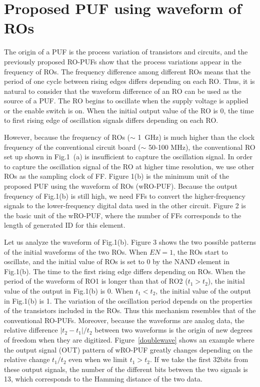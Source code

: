 ﻿\documentclass[aps,preprint,prb,superscriptaddress,amsmath,showpacs,tightenlines]{revtex4}
\begin{document}
\section{Proposed PUF using waveform of ROs}
The origin of a PUF is the process variation of transistors and circuits, 
and the previously proposed RO-PUFs show that
the process variations appear in the frequency of ROs.
The frequency difference among different ROs 
means that the period of one cycle between rising edges 
differs depending on each RO. 
Thus, it is natural to consider that the waveform difference of an RO
can be used as the source of a PUF.
The RO begins to oscillate when the supply voltage is applied
or the enable switch is on.
When the initial output value of the RO is 0, 
the time to first rising edge of oscillation signals differs
depending on each RO.

However, because the frequency of ROs ($\sim$ 1~GHz) 
is much higher than the clock frequency of the conventional circuit board ($\sim$ 50-100 MHz),
the conventional RO set up shown in Fig.1~(a) is insufficient to 
capture the oscillation signal.
In order to capture the oscillation signal of the RO at higher time resolution, 
we use other ROs as the sampling clock of FF.
Figure 1(b) is the minimum unit of the proposed PUF using the waveform of ROs (wRO-PUF).
Because the output frequency of Fig.1(b) is still high,
we need FFs to convert the higher-frequency signals to the lower-frequency digital data
 used in the other circuit.
Figure 2 is the basic unit of the wRO-PUF, 
where the number of FFs corresponds to the length of 
generated ID for this element.


Let us analyze the waveform of Fig.1(b).
Figure 3 shows the two possible patterns of the initial waveforms of the 
two ROs.
When $EN=1$, the ROs start to oscillate, and 
the initial value of ROs is set to 0 by the NAND element in Fig.1(b).
The time to the first rising edge differs depending on ROs.
When the period of the waveform of RO1 is longer than that of RO2 ($t_1>t_2$),
the initial value of the output in Fig.1(b) is 0.
When $t_1<t_2$, the initial value of the output in Fig.1(b) is 1. 
The variation of the oscillation period depends on the properties of the transistors 
included in the ROs. Thus this mechanism resembles that of the conventional RO-PUFs.
Moreover, because the waveforms are analog data, 
the relative difference $|t_2-t_1|/t_2$ between two waveforms is the origin of
new degrees of freedom when they are digitized.
Figure~\ref{doublewave} shows an example where the output signal (OUT) pattern of wRO-PUF greatly changes 
depending on the relative change $t_1/t_2$ even when we limit $t_1>t_2$.
If we take the first 32bits from these output signals, 
the number of the different bits between the two signals is 13,
which corresponds to the Hamming distance of the two data.
\end{document}
